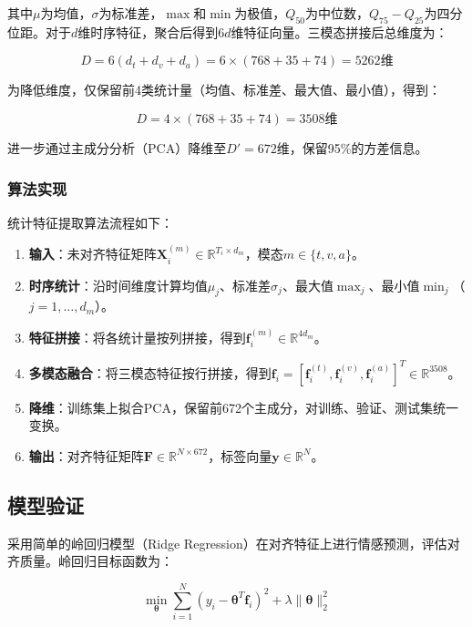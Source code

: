其中$\mu$为均值，$\sigma$为标准差，$\max$和$\min$为极值，$Q_{50}$为中位数，$Q_{75}-Q_{25}$为四分位距。对于$d$维时序特征，聚合后得到$6d$维特征向量。三模态拼接后总维度为：

\begin{equation}
D = 6(d_t + d_v + d_a) = 6 \times (768 + 35 + 74) = 5262 \text{维}
\end{equation}

为降低维度，仅保留前4类统计量（均值、标准差、最大值、最小值），得到：

\begin{equation}
D = 4 \times (768 + 35 + 74) = 3508 \text{维}
\end{equation}

进一步通过主成分分析（PCA）降维至$D'=672$维，保留95\%的方差信息。

\subsubsection{算法实现}

统计特征提取算法流程如下：

\begin{enumerate}
\item \textbf{输入}：未对齐特征矩阵$\mathbf{X}_i^{(m)} \in \mathbb{R}^{T_i \times d_m}$，模态$m \in \{t, v, a\}$。
\item \textbf{时序统计}：沿时间维度计算均值$\mu_j$、标准差$\sigma_j$、最大值$\max_j$、最小值$\min_j$（$j=1,\ldots,d_m$）。
\item \textbf{特征拼接}：将各统计量按列拼接，得到$\mathbf{f}_i^{(m)} \in \mathbb{R}^{4d_m}$。
\item \textbf{多模态融合}：将三模态特征按行拼接，得到$\mathbf{f}_i = [\mathbf{f}_i^{(t)}, \mathbf{f}_i^{(v)}, \mathbf{f}_i^{(a)}]^T \in \mathbb{R}^{3508}$。
\item \textbf{降维}：训练集上拟合PCA，保留前672个主成分，对训练、验证、测试集统一变换。
\item \textbf{输出}：对齐特征矩阵$\mathbf{F} \in \mathbb{R}^{N \times 672}$，标签向量$\mathbf{y} \in \mathbb{R}^N$。
\end{enumerate}

\subsection{模型验证}

采用简单的岭回归模型（Ridge Regression）在对齐特征上进行情感预测，评估对齐质量。岭回归目标函数为：

\begin{equation}
\min_{\boldsymbol{\theta}} \sum_{i=1}^{N} (y_i - \boldsymbol{\theta}^T \mathbf{f}_i)^2 + \lambda \|\boldsymbol{\theta}\|_2^2
\end{equation}

